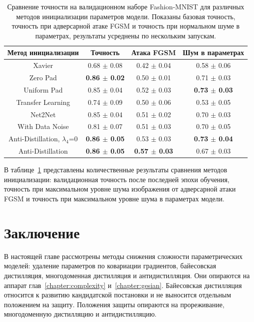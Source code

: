 \begin{table}[!h]
\caption{\label{acc_tab} Сравнение точности на валидационном наборе Fashion-MNIST для различных методов инициализации параметров модели. Показаны базовая точность, точность при адверсарной атаке FGSM и точность при нормальном шуме в параметрах, результаты усреднены по нескольким запускам.}

 \begin{tabular}{|c|c|c|c|}
        \hline
        Метод инициализации & Точность &  Атака FGSM &
Шум в параметрах \\
        \hline
        Xavier & 0.68 $\pm$ 0.08 & 0.42 $\pm$ 0.04 & 0.58 $\pm$ 0.06\\
    \hline
Zero Pad & \textbf{0.86 $\pm$ 0.02} & 0.50 $\pm$ 0.01 & 0.71 $\pm$ 0.03\\
\hline
Uniform Pad & 0.85 $\pm$ 0.04 & 0.52 $\pm$ 0.03 & \textbf{0.73 $\pm$ 0.03}\\
\hline
Transfer Learning & 0.74 $\pm$ 0.09 & 0.50 $\pm$ 0.06 & 0.53 $\pm$ 0.05\\
\hline
Net2Net & 0.85 $\pm$ 0.04 & 0.51 $\pm$ 0.02 & 0.70 $\pm$ 0.03\\
\hline
With Data Noise & 0.81 $\pm$ 0.07 & 0.51 $\pm$ 0.03 & 0.70 $\pm$ 0.05\\
\hline
Anti-Distillation, $\lambda_4$=0 & \textbf{0.86 $\pm$ 0.05} & 0.53 $\pm$ 0.03 & \textbf{0.73 $\pm$ 0.04}\\
\hline
Anti-Distillation & \textbf{0.86 $\pm$ 0.05} & \textbf{0.57 $\pm$ 0.03} & 0.67 $\pm$ 0.03\\
\hline
\end{tabular}

\end{table}

В таблице~\ref{acc_tab} представлены количественные результаты сравнения методов инициализации: валидационная точность после последней эпохи обучения, точность при максимальном уровне шума изображения от адверсарной атаки FGSM и точность при максимальном уровне шума в параметрах модели.

\section{Заключение}

В настоящей главе рассмотрены методы снижения сложности параметрических моделей: удаление параметров по ковариации градиентов, байесовская дистилляция, многодоменная дистилляция и антидистилляция. Они опираются на аппарат глав~\ref{chapter:complexity} и~\ref{chapter:gesian}. Байесовская дистилляция относится к развитию кандидатской постановки и не выносится отдельным положением на защиту. Положения защиты опираются на прореживание, многодоменную дистилляцию и антидистилляцию.

